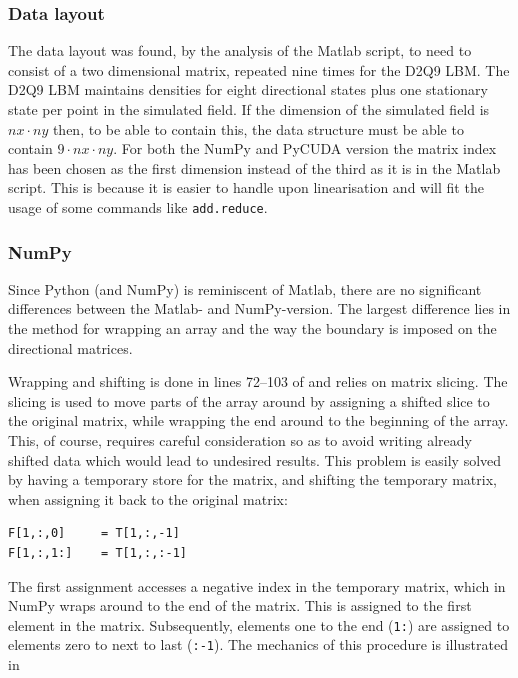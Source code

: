 \subsubsection{Data layout}
The data layout was found, by the analysis of the Matlab script, to need to consist of a two dimensional matrix, repeated nine times for the D2Q9 LBM. The D2Q9 LBM maintains densities for eight directional states plus one stationary state per point in the simulated field. If the dimension of the simulated field is $nx \cdot ny$ then, to be able to contain this, the data structure must be able to contain $9 \cdot nx \cdot ny$. For both the NumPy and PyCUDA version the matrix index has been chosen as the first dimension instead of the third as it is in the Matlab script. This is because it is easier to handle upon linearisation and will fit the usage of some commands like \texttt{add.reduce}.



\subsubsection{NumPy}
Since Python (and NumPy) is reminiscent of Matlab, there are no significant differences between the Matlab- and NumPy-version. The largest difference lies in the method for wrapping an array and the way the boundary is imposed on the directional matrices.

Wrapping and shifting is done in lines 72--103 of  and relies on matrix slicing. The slicing is used to move parts of the array around by assigning a shifted slice to the original matrix, while wrapping the end around to the beginning of the array. This, of course, requires careful consideration so as to avoid writing already shifted data which would lead to undesired results. This problem is easily solved by having a temporary store for the matrix, and shifting the temporary matrix, when assigning it back to the original matrix:

\begin{verbatim}
F[1,:,0]     = T[1,:,-1]
F[1,:,1:]    = T[1,:,:-1]
\end{verbatim}

The first assignment accesses a negative index in the temporary matrix, which in NumPy wraps around to the end of the matrix. This is assigned to the first element in the matrix. Subsequently, elements one to the end (\texttt{1:}) are assigned to elements zero to next to last (\texttt{:-1}). The mechanics of this procedure is illustrated in 

